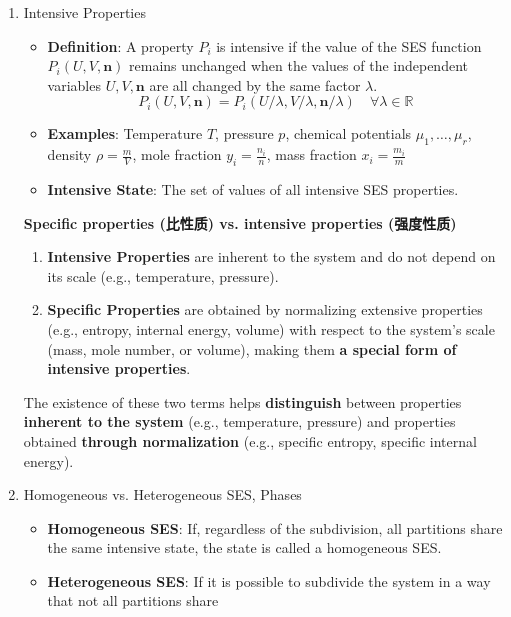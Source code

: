 \begin{defn}
\begin{enumerate}
    \item Intensive Properties
    \begin{itemize}
        \item \textbf{Definition}: A property \( P_i \) is intensive if the value of the SES function \( P_i(U,V,\mathbf{n}) \) remains 
        unchanged when the values of the independent variables \( U, V, \mathbf{n} \) are all changed by the same factor \(\lambda\).
        \[
        P_i(U, V, \mathbf{n}) = P_i(U/\lambda, V/\lambda, \mathbf{n}/\lambda) \quad \forall \lambda \in \mathbb{R}
        \]
        \item \textbf{Examples}: Temperature \( T \), pressure \( p \), chemical potentials \( \mu_1, \ldots, \mu_r \), 
        density \( \rho = \frac{m}{V} \), mole fraction \( y_i = \frac{n_i}{n} \), mass fraction \( x_i = \frac{m_i}{m} \)
        \item \textbf{Intensive State}: The set of values of all intensive SES properties.
    \end{itemize}
    \begin{zhu}
        \textbf{Specific properties (比性质) vs. intensive properties (强度性质) }
        \begin{enumerate}
                \item \textbf{Intensive Properties} are inherent to the system and do not depend on its scale (e.g., temperature, pressure).
                \item \textbf{Specific Properties} are obtained by normalizing extensive properties (e.g., entropy, internal energy, volume) 
                with respect to the system's scale (mass, mole number, or volume), making them \textbf{a special form of intensive properties}.
        \end{enumerate}
        The existence of these two terms helps \textbf{distinguish} between properties \textbf{inherent to the system} (e.g., temperature, pressure) and 
        properties obtained \textbf{through normalization} (e.g., specific entropy, specific internal energy).
    \end{zhu}
    \item Homogeneous vs. Heterogeneous SES, Phases
    \begin{itemize}
        \item \textbf{Homogeneous SES}: If, regardless of the subdivision, all partitions share the same intensive state, the state is called a homogeneous SES.
        \item \textbf{Heterogeneous SES}: If it is possible to subdivide the system in a way that not all partitions share

\end{itemize}
\end{enumerate}
\end{defn}
